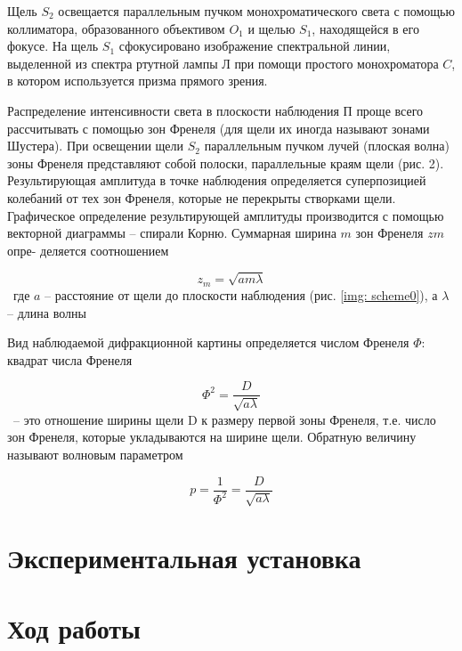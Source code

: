 \documentclass[a5paper,10pt, twoside]{article} %
\begin{document}
	Щель $S_2$ освещается параллельным пучком монохроматического света с помощью коллиматора, 
	образованного объективом $O_1$ и щелью $S_1$, находящейся в его фокусе. На щель $S_1$ сфокусировано
	изображение спектральной линии, выделенной из спектра ртутной лампы $Л$ при помощи простого
	монохроматора $C$, в котором используется призма прямого зрения.

	Распределение интенсивности света в плоскости наблюдения $П$ проще всего рассчитывать с помощью зон
	Френеля (для щели их иногда называют зонами Шустера). При освещении щели $S_2$ параллельным пучком
	лучей (плоская волна) зоны Френеля представляют собой полоски, параллельные краям щели (рис. 2).
	Результирующая амплитуда в точке наблюдения определяется суперпозицией колебаний от тех зон Френеля,
	которые не перекрыты створками щели. Графическое определение результирующей амплитуды производится
	с помощью векторной диаграммы -- спирали Корню. Суммарная ширина $m$ зон Френеля $z m$ опре-
	деляется соотношением

	\begin{equation}
		z_m = \sqrt{a m \lambda}
	\end{equation} \label{eq::wide}
	\
	где $a$ -- расстояние от щели до плоскости наблюдения (рис. \ref{img: scheme0}), а $\lambda$ --
	длина волны

	Вид наблюдаемой дифракционной картины определяется числом Френеля $\Phi$: квадрат числа Френеля

	\begin{displaymath}
		\Phi^2 = \frac{D}{\sqrt{a \lambda}}
	\end{displaymath}
	\
	-- это отношение ширины щели D к размеру первой зоны Френеля, т.е. число зон Френеля, которые
	укладываются на ширине щели. Обратную величину называют волновым параметром

	\begin{displaymath}
		p = \frac{1}{\Phi^2} = \frac{D}{\sqrt{a \lambda}}
	\end{displaymath}


\section{Экспериментальная установка}
	


\section{Ход работы}
\end{document}
